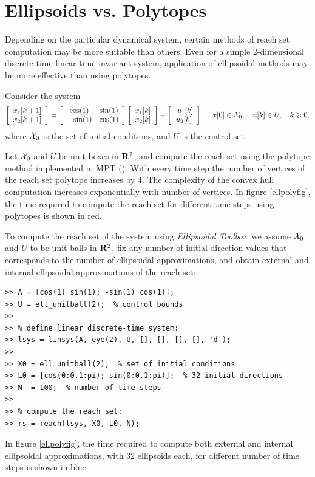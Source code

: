 \section{Ellipsoids vs. Polytopes}
Depending on the particular dynamical system, certain methods of
reach set computation may be more suitable than others.
Even for a simple 2-dimensional discrete-time linear time-invariant
system, application of ellipsoidal methods may be more effective
than using polytopes.

Consider the system
\[ \left[\begin{array}{c}
x_1[k+1]\\
x_2[k+1]\end{array}\right] = \left[\begin{array}{cc}
\cos(1) & \sin(1)\\
-\sin(1) & \cos(1)\end{array}\right]\left[\begin{array}{c}
x_1[k]\\
x_2[k]\end{array}\right] + \left[\begin{array}{c}\
u_1[k]\\
u_2[k]\end{array}\right], ~~~ x[0]\in\XX_0, ~~~ u[k]\in U, ~~~ k\geq0, \]
where $\XX_0$ is the set of initial conditions, and $U$ is the control set.

Let $\XX_0$ and $U$ be unit boxes in ${\bf R}^2$, and compute the reach set
using the polytope method implemented in MPT (\cite{mpt}). With every time step
the number of vertices of the reach set polytope increases by $4$.
The complexity of the
convex hull computation increases exponentially with number of vertices.
In figure \ref{ellpolyfig}, the time required to compute the reach set
for different time steps using polytopes is shown in red.

To compute the reach set of the system using {\it Ellipsoidal Toolbox},
we assume $\XX_0$ and $U$ to be unit balls in ${\bf R}^2$, fix any number
of initial direction values that corresponds to the number of ellipsoidal
approximations, and obtain external and internal ellipsoidal approximations
of the reach set:
{\tt \begin{verbatim}
>> A = [cos(1) sin(1); -sin(1) cos(1)];
>> U = ell_unitball(2);  % control bounds
>>
>> % define linear discrete-time system:
>> lsys = linsys(A, eye(2), U, [], [], [], [], 'd');
>>
>> X0 = ell_unitball(2);  % set of initial conditions
>> L0 = [cos(0:0.1:pi); sin(0:0.1:pi)];  % 32 initial directions
>> N  = 100;  % number of time steps
>>
>> % compute the reach set:
>> rs = reach(lsys, X0, L0, N);
\end{verbatim}}
In figure \ref{ellpolyfig}, the time required to compute both external
and internal ellipsoidal approximations, with $32$ ellipsoids each,
for different number of time steps is shown in blue.

